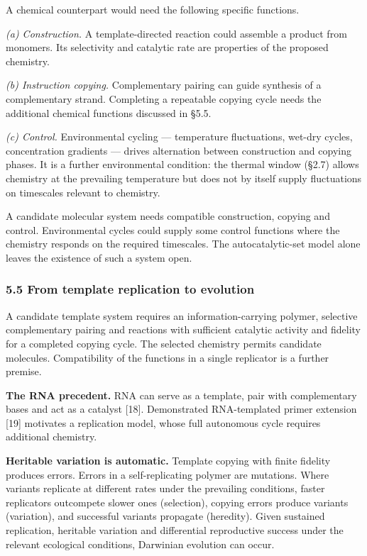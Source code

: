 \documentclass[
]{article}
\begin{document}
A chemical counterpart would need the following specific functions.

\emph{(a) Construction.} A template-directed reaction could assemble a
product from monomers. Its selectivity and catalytic rate are properties
of the proposed chemistry.

\emph{(b) Instruction copying.} Complementary pairing can guide
synthesis of a complementary strand. Completing a repeatable copying
cycle needs the additional chemical functions discussed in §5.5.

\emph{(c) Control.} Environmental cycling --- temperature fluctuations,
wet-dry cycles, concentration gradients --- drives alternation between
construction and copying phases. It is a further environmental
condition: the thermal window (§2.7) allows chemistry at the prevailing
temperature but does not by itself supply fluctuations on timescales
relevant to chemistry.

A candidate molecular system needs compatible construction, copying and
control. Environmental cycles could supply some control functions where
the chemistry responds on the required timescales. The autocatalytic-set
model alone leaves the existence of such a system open.

\hypertarget{from-template-replication-to-evolution}{%
\subsubsection{5.5 From template replication to
evolution}\label{from-template-replication-to-evolution}}

A candidate template system requires an information-carrying polymer,
selective complementary pairing and reactions with sufficient catalytic
activity and fidelity for a completed copying cycle. The selected
chemistry permits candidate molecules. Compatibility of the functions in
a single replicator is a further premise.

\textbf{The RNA precedent.} RNA can serve as a template, pair with
complementary bases and act as a catalyst {[}18{]}. Demonstrated
RNA-templated primer extension {[}19{]} motivates a replication model,
whose full autonomous cycle requires additional chemistry.

\textbf{Heritable variation is automatic.} Template copying with finite
fidelity produces errors. Errors in a self-replicating polymer are
mutations. Where variants replicate at different rates under the
prevailing conditions, faster replicators outcompete slower ones
(selection), copying errors produce variants (variation), and successful
variants propagate (heredity). Given sustained replication, heritable
variation and differential reproductive success under the relevant
ecological conditions, Darwinian evolution can occur.
\end{document}
